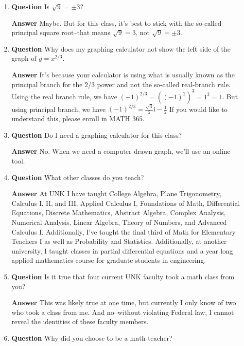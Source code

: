 \documentclass[12pt]{article}
\newcounter{ex}\setcounter{ex}{0}
\begin{document}
\begin{enumerate}
\item  \textbf{Question} Is \(\sqrt{9} = \pm 3\)?

  \textbf{Answer}  Maybe.  But for this class, it's best to stick with the so-called 
  principal square root--that means \(\sqrt{9} = 3\), not  \(\sqrt{9} = \pm 3\).

\item  \textbf{Question} Why does my graphing calculator not show the left side of the graph of \(y = x^{2/3}\). 

\textbf{Answer} It's because your calculator is using what is usually known as the principal branch for the \(2/3\) power and not the so-called real-branch rule.  Using the real branch rule,
we have \((-1)^{2/3} = ((-1)^2)^3 = 1^3 = 1\). But using principal branch, we have \((-1)^{2/3} = \frac{\sqrt{3}}{2}  \mathrm{i}  -\frac{1}{2}\) If you would like to understand this, please enroll in MATH 365.

\item \textbf{Question} Do I need a graphing calculator for this class?

\textbf{Answer} No. When we need a computer drawn graph, we'll use an online tool.

\item \textbf{Question} What other classes do you teach?

\textbf{Answer} At UNK I have taught College Algebra, 
   Plane Trigonometry, Calculus I, II, and III, Applied Calculus I,
   Foundations of Math, Differential Equations, Discrete Mathematics, Abstract Algebra, Complex Analysis,
   Numerical Analysis, Linear Algebra, Theory of Numbers, and Advanced Calculus I. Additionally, I've
   taught the final third of Math for Elementary Teachers I as well as  Probability and Statistics.
   Additionally, at another university, I taught classes in partial differential equations and a
   year long applied mathematics course for graduate students in engineering.

\item  \textbf{Question} Is it true that four current UNK faculty took a math class from you?

 \textbf{Answer}  This was likely true at one time, but currently I only know of two who 
 took a class from me. And no--without violating Federal law, I cannot reveal the identities of
 these faculty members.

\item  \textbf{Question} Why did you choose to be a math teacher?


\end{enumerate}
\end{document}
